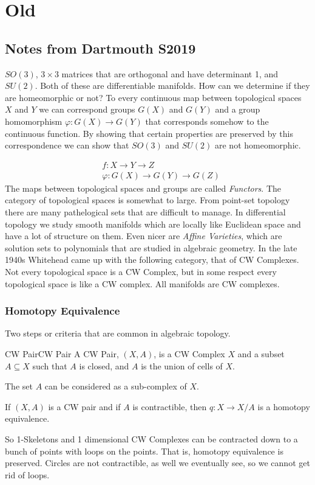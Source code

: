 \documentclass{book}                                                           %
\begin{document}
\chapter{Old}
    \section{Notes from Dartmouth S2019}
    \begin{example}
        $SO(3)$, $3\times{3}$ matrices that are orthogonal and have determinant
        1, and $SU(2)$. Both of these are differentiable manifolds. How can we
        determine if they are homeomorphic or not? To every continuous map
        between topological spaces $X$ and $Y$ we can correspond groups $G(X)$
        and $G(Y)$ and a group homomorphism $\varphi:G(X)\rightarrow{G}(Y)$ that
        corresponds somehow to the continuous function. By showing that certain
        properties are preserved by this correspondence we can show that $SO(3)$
        and $SU(2)$ are not homeomorphic.
    \end{example}
    \begin{align}
        &f:X\rightarrow{Y}\rightarrow{Z}\\
        &\varphi:G(X)\rightarrow{G}(Y)\rightarrow{G}(Z)
    \end{align}
    The maps between topological spaces and groups are called \textit{Functors}.
    The category of topological spaces is somewhat to large. From point-set
    topology there are many pathelogical sets that are difficult to manage. In
    differential topology we study smooth manifolds which are locally like
    Euclidean space and have a lot of structure on them. Even nicer are
    \textit{Affine Varieties}, which are solution sets to polynomials that are
    studied in algebraic geometry. In the late 1940s Whitehead came up with the
    following category, that of CW Complexes. Not every topological space is a
    CW Complex, but in some respect every topological space is like a CW
    complex. All manifolds are CW complexes.
    \subsection{Homotopy Equivalence}
        Two steps or criteria that are common in algebraic
        topology.
        \begin{ldefinition}{CW Pair}{CW Pair}
            A CW Pair, $(X,A)$, is a CW Complex $X$ and a
            subset $A\subseteq{X}$ such that $A$ is closed,
            and $A$ is the union of cells of $X$.
        \end{ldefinition}
        The set $A$ can be considered as a sub-complex
        of $X$.
        \begin{theorem}
            If $(X,A)$ is a CW pair and if $A$ is
            contractible, then $q:X\rightarrow{X}/A$
            is a homotopy equivalence.
        \end{theorem}
        So 1-Skeletons and 1 dimensional CW Complexes can
        be contracted down to a bunch of points with loops
        on the points. That is, homotopy equivalence is
        preserved. Circles are not contractible, as well
        we eventually see, so we cannot get rid of loops.
\end{document}
